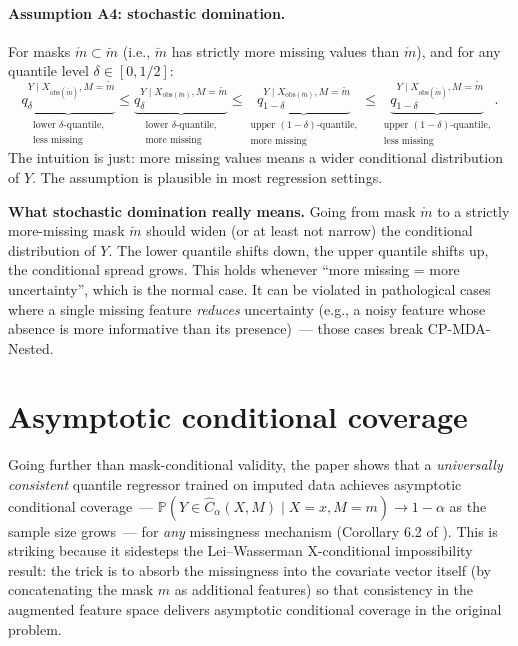 \documentclass[letterpaper,11pt,leqno]{article}
\begin{document}
\paragraph{Assumption A4: stochastic domination.} For masks $\mathring{m} \subset \breve{m}$ (i.e., $\breve{m}$ has strictly more missing values than $\mathring{m}$), and for any quantile level $\delta \in [0, 1/2]$:
\begin{equation*}
\underbrace{q_{\delta}^{Y \mid X_{\text{obs}(\mathring{m})}, M = \mathring{m}}}_{\substack{\text{lower } \delta\text{-quantile,}\\\text{less missing}}}
\leq
\underbrace{q_{\delta}^{Y \mid X_{\text{obs}(\breve{m})}, M = \breve{m}}}_{\substack{\text{lower } \delta\text{-quantile,}\\\text{more missing}}}
\leq
\underbrace{q_{1-\delta}^{Y \mid X_{\text{obs}(\breve{m})}, M = \breve{m}}}_{\substack{\text{upper } (1-\delta)\text{-quantile,}\\\text{more missing}}}
\leq
\underbrace{q_{1-\delta}^{Y \mid X_{\text{obs}(\mathring{m})}, M = \mathring{m}}}_{\substack{\text{upper } (1-\delta)\text{-quantile,}\\\text{less missing}}}.
\end{equation*}
The intuition is just: more missing values means a wider conditional distribution of $Y$. The assumption is plausible in most regression settings.

\begin{assumptionexplain}
\textbf{What stochastic domination really means.} Going from mask $\mathring{m}$ to a strictly more-missing mask $\breve{m}$ should widen (or at least not narrow) the conditional distribution of $Y$. The lower quantile shifts down, the upper quantile shifts up, the conditional spread grows. This holds whenever ``more missing = more uncertainty'', which is the normal case. It can be violated in pathological cases where a single missing feature \emph{reduces} uncertainty (e.g., a noisy feature whose absence is more informative than its presence)~--- those cases break CP-MDA-Nested.
\end{assumptionexplain}

\section{Asymptotic conditional coverage}\label{s:asymptotic}

Going further than mask-conditional validity, the paper shows that a \emph{universally consistent} quantile regressor trained on imputed data achieves asymptotic conditional coverage~--- $\mathbb{P}(Y \in \hat{C}_{\alpha}(X, M) \mid X = x, M = m) \to 1 - \alpha$ as the sample size grows~--- for \emph{any} missingness mechanism (Corollary 6.2 of \cite{zaffran2024missing}). This is striking because it sidesteps the Lei--Wasserman X-conditional impossibility result: the trick is to absorb the missingness into the covariate vector itself (by concatenating the mask $m$ as additional features) so that consistency in the augmented feature space delivers asymptotic conditional coverage in the original problem.
\end{document}
